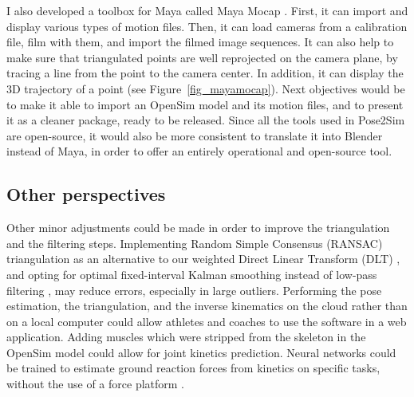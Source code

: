 I also developed a toolbox for Maya \cite{Maya1998} called Maya Mocap \cite{Pagnon2020}. First, it can import and display various types of motion files. Then, it can load cameras from a calibration file, film with them, and import the filmed image sequences. It can also help to make sure that triangulated points are well reprojected on the camera plane, by tracing a line from the point to the camera center. In addition, it can display the 3D trajectory of a point (see Figure~\ref{fig_mayamocap}). Next objectives would be to make it able to import an OpenSim model and its motion files, and to present it as a cleaner package, ready to be released. Since all the tools used in Pose2Sim are open-source, it would also be more consistent to translate it into Blender instead of Maya, in order to offer an entirely operational and open-source tool.


\FloatBarrier
\subsection{Other perspectives}

Other minor adjustments could be made in order to improve the triangulation and the filtering steps. Implementing Random Simple Consensus (RANSAC) triangulation \cite{Fischler1981} as an alternative to our weighted Direct Linear Transform (DLT) \cite{Pagnon2021}, and opting for optimal fixed-interval Kalman smoothing instead of low-pass filtering \cite{Rauch1965,Needham2021a}, may reduce errors, especially in large outliers. Performing the pose estimation, the triangulation, and the inverse kinematics on the cloud rather than on a local computer could allow athletes and coaches to use the software in a web application. Adding muscles which were stripped from the skeleton in the OpenSim model could allow for joint kinetics prediction. Neural networks could be trained to estimate ground reaction forces from kinetics on specific tasks, without the use of a force platform \cite{Oh2013,Johnson2018,Mundt2019}.
